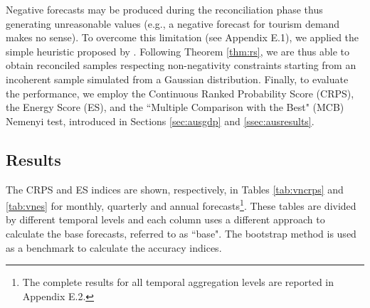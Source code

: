 \documentclass[12pt]{article}
\theoremstyle{definition}
\begin{document}
Negative forecasts may be produced during the reconciliation phase \citep{wickramasuriya2020, difonzo2022a, difonzo2023a} thus generating unreasonable values (e.g., a negative forecast for tourism demand makes no sense). To overcome this limitation (see Appendix E.1), we applied the simple heuristic proposed by \cite{difonzo2022b, difonzo2023a}. Following Theorem \ref{thm:rs}, we are thus able to obtain reconciled samples respecting non-negativity constraints starting from an incoherent sample simulated from a Gaussian distribution. Finally, to evaluate the performance, we employ the Continuous Ranked Probability Score (CRPS), the Energy Score (ES), and the “Multiple Comparison with the Best" (MCB) Nemenyi test, introduced in Sections \ref{sec:ausgdp} and \ref{ssec:ausresults}. 

\subsection{Results}

The CRPS and ES indices are shown, respectively, in Tables \ref{tab:vncrps} and \ref{tab:vnes} for monthly, quarterly and annual forecasts\footnote{The complete results for all temporal aggregation levels are reported in Appendix E.2.}. These tables are divided by different temporal levels and each column uses a different approach to calculate the base forecasts, referred to as “base". The bootstrap method is used as a benchmark to calculate the accuracy indices.

\begin{table}[!tb]
	\centering
	\begingroup
	\fontsize{9}{10}\selectfont
	
	\endgroup
	\caption{$\overline{RelCRPS}$ defined in \eqref{eq:skill} and \eqref{eq:skill_all} for the Australian Tourism Demand dataset. %
	Approaches performing worse than the benchmark (bootstrap base forecasts, ctjb) are highlighted in red, the best for each column is marked in bold, and the overall lowest value is highlighted in blue. The reconciliation approaches are described in \autoref{tab:notation}.}
	\label{tab:vncrps}
	\vspace*{-0.5\baselineskip}
\end{table}

\begin{table}[!tb]
	\centering
	\begingroup
	\fontsize{9}{10}\selectfont
	
	\endgroup
	\caption{ES ratio indices defined in \eqref{eq:skill} and \eqref{eq:skill_all} for the Australian Tourism Demand dataset. %
	Approaches performing worse than the benchmark (bootstrap base forecasts, ctjb) are highlighted in red, the best for each column is marked in bold, and the overall lowest value is highlighted in blue. The reconciliation approaches are described in \autoref{tab:notation}.}
	\label{tab:vnes}
	\vspace*{-0.5\baselineskip}
\end{table}
\end{document}
